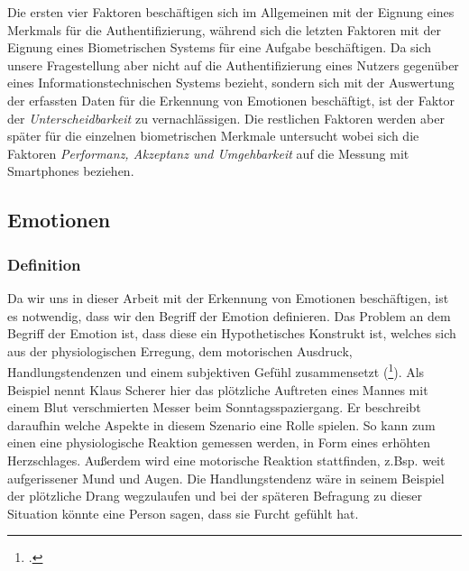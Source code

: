 Die ersten vier Faktoren beschäftigen sich im Allgemeinen mit der Eignung eines Merkmals für die Authentifizierung, während sich die letzten Faktoren mit der Eignung eines Biometrischen Systems für eine Aufgabe beschäftigen. Da sich unsere Fragestellung aber nicht auf die Authentifizierung eines Nutzers gegenüber eines Informationstechnischen Systems bezieht, sondern sich mit der Auswertung der erfassten Daten für die Erkennung von Emotionen beschäftigt, ist der Faktor der \textit{Unterscheidbarkeit} zu vernachlässigen. Die restlichen Faktoren werden aber später für die einzelnen biometrischen Merkmale untersucht wobei sich die Faktoren \textit{Performanz, Akzeptanz und Umgehbarkeit} auf die Messung mit Smartphones beziehen.
\subsection{Emotionen}
\subsubsection{Definition}
Da wir uns in dieser Arbeit mit der Erkennung von Emotionen beschäftigen, ist es notwendig, dass wir den Begriff der Emotion definieren. Das Problem an dem Begriff der Emotion ist, dass diese ein Hypothetisches Konstrukt ist, welches sich aus der physiologischen Erregung, dem motorischen Ausdruck, Handlungstendenzen und einem subjektiven Gefühl zusammensetzt (\footcite[Vgl.][S.166 Abschnitt Emotion]{Kla02}).\newline
Als Beispiel nennt Klaus Scherer hier das plötzliche Auftreten eines Mannes mit einem Blut verschmierten Messer beim Sonntagsspaziergang. Er beschreibt daraufhin welche Aspekte in diesem Szenario eine Rolle spielen. So kann zum einen eine physiologische Reaktion gemessen werden, in Form eines erhöhten Herzschlages. Außerdem wird eine motorische Reaktion stattfinden, z.Bsp. weit aufgerissener Mund und Augen. Die Handlungstendenz wäre in seinem Beispiel der plötzliche Drang wegzulaufen und bei der späteren Befragung zu dieser Situation könnte eine Person sagen, dass sie Furcht gefühlt hat.
